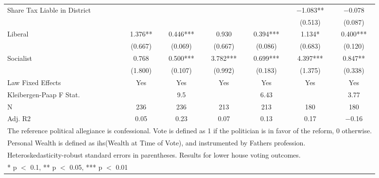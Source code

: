 \begin{table}[!h]
{\begin{tabular}[t]{lcccccc}
Share Tax Liable in District &  &  &  &  & \num{-1.083}** & \num{-0.078}\\
 &  &  &  &  & (\num{0.513}) & (\num{0.087})\\
Liberal & \num{1.376}** & \num{0.446}*** & \num{0.930} & \num{0.394}*** & \num{1.134}* & \num{0.400}***\\
 & (\num{0.667}) & (\num{0.069}) & (\num{0.667}) & (\num{0.086}) & (\num{0.683}) & (\num{0.120})\\
Socialist & \num{0.768} & \num{0.500}*** & \num{3.782}*** & \num{0.699}*** & \num{4.397}*** & \num{0.847}**\\
 & (\num{1.800}) & (\num{0.107}) & (\num{0.992}) & (\num{0.183}) & (\num{1.375}) & (\num{0.338})\\
\midrule
Law Fixed Effects & Yes & Yes & Yes & Yes & Yes & Yes\\
Kleibergen-Paap F Stat. &  & 9.5 &  & 6.43 &  & 3.77\\
N & \num{236} & \num{236} & \num{213} & \num{213} & \num{180} & \num{180}\\
Adj. R2 & \num{0.05} & \num{0.23} & \num{0.07} & \num{0.13} & \num{0.17} & \num{-0.16}\\
\bottomrule
\multicolumn{7}{l}{\rule{0pt}{1em}The reference political allegiance is confessional. Vote is defined as 1 if the politician is in favor of the reform, 0 otherwise.}\\
\multicolumn{7}{l}{\rule{0pt}{1em}Personal Wealth is defined as ihs(Wealth at Time of Vote), and instrumented by Fathers profession.}\\
\multicolumn{7}{l}{\rule{0pt}{1em}Heteroskedasticity-robust standard errors in parentheses. Results for lower house voting outcomes.}\\
\multicolumn{7}{l}{\rule{0pt}{1em}* p $<$ 0.1, ** p $<$ 0.05, *** p $<$ 0.01}\\
\end{tabular}}
\end{table}
